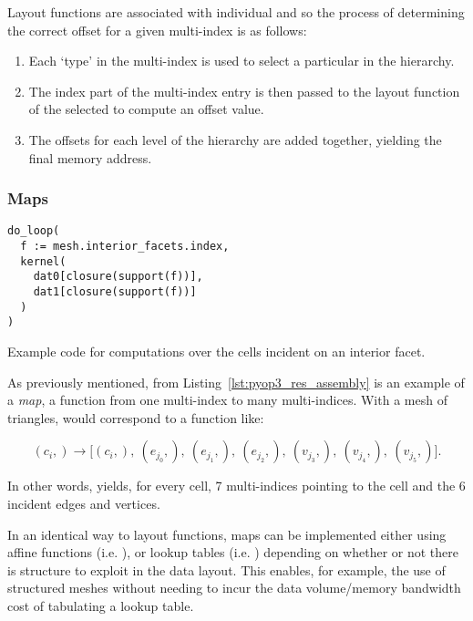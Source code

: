 Layout functions are associated with individual  and so the process of determining the correct offset for a given multi-index is as follows:

\begin{enumerate}
  \item
    Each `type' in the multi-index is used to select a particular  in the hierarchy.

  \item
    The index part of the multi-index entry is then passed to the layout function of the selected  to compute an offset value.

  \item
    The offsets for each level of the hierarchy are added together, yielding the final memory address.
\end{enumerate}

\subsubsection{Maps}
\label{sec:impl_datalayout_maps}

\begin{listing}
  \begin{verbatim}
do_loop(
  f := mesh.interior_facets.index,
  kernel(
    dat0[closure(support(f))],
    dat1[closure(support(f))]
  )
)
  \end{verbatim}
  \caption{Example  code for computations over the cells incident on an interior facet.}
  \label{lst:pyop3_intfacet}
\end{listing}

As previously mentioned,  from Listing~\ref{lst:pyop3_res_assembly} is an example of a \textit{map}, a function from one multi-index to many multi-indices.
With a mesh of triangles,  would correspond to a function like:

\begin{equation*}
  (c_i,)
  \to \big[
  (c_i,)
  ,\ (e_{j_0},) ,\ (e_{j_1},) ,\ (e_{j_2},)
  ,\ (v_{j_3},) ,\ (v_{j_4},) ,\ (v_{j_5},) \big] .
\end{equation*}

In other words,  yields, for every cell, 7 multi-indices pointing to the cell and the 6 incident edges and vertices.

In an identical way to layout functions, maps can be implemented either using affine functions (i.e. ), or lookup tables (i.e. ) depending on whether or not there is structure to exploit in the data layout.
This enables, for example, the use of structured meshes without needing to incur the data volume/memory bandwidth cost of tabulating a lookup table.

